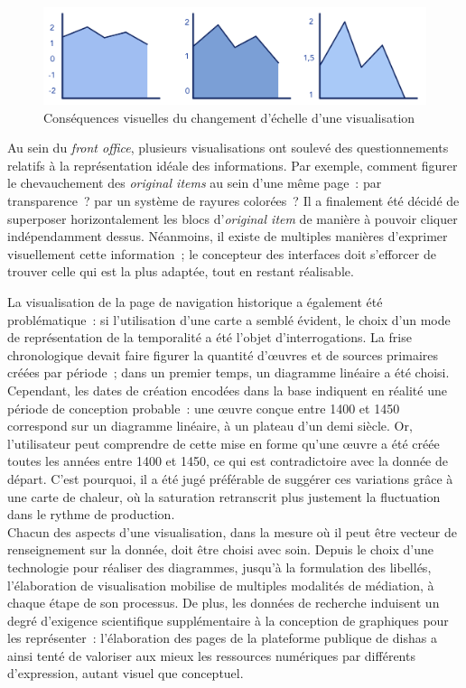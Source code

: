 \documentclass[a4paper,12pt,twoside]{book}
\newcommand{\eng}{\emph}
\newcommand{\oi}{\eng{original item}\xspace}
\newcommand{\ois}{\eng{original items}\xspace}
\newcommand{\fo}{\eng{front office}\xspace}
\newcommand{\dishas}{\gls{dishas}\xspace}
\begin{document}
\begin{figure}[h!]
	\centering
	\includegraphics[width=15cm]{Images/Echelle-visualisation.png}
	\caption{Conséquences visuelles du changement d'échelle d'une visualisation}
\end{figure}

Au sein du \fo, plusieurs visualisations ont soulevé des questionnements relatifs à la représentation idéale des informations. Par exemple, comment figurer le chevauchement des \ois au sein d'une même page~: par transparence~? par un système de rayures colorées~? Il a finalement été décidé de superposer horizontalement les blocs d'\oi de manière à pouvoir cliquer indépendamment dessus. Néanmoins, il existe de multiples manières d'exprimer visuellement cette information~; le concepteur des interfaces doit s'efforcer de trouver celle qui est la plus adaptée, tout en restant réalisable.

La visualisation de la page de navigation historique a également été problématique~: si l'utilisation d'une carte a semblé évident, le choix d'un mode de représentation de la temporalité a été l'objet d'interrogations. La frise chronologique devait faire figurer la quantité d'œuvres et de sources primaires créées par période~; dans un premier temps, un diagramme linéaire a été choisi. Cependant, les dates de création encodées dans la base indiquent en réalité une période de conception probable~: une œuvre conçue entre 1400 et 1450 correspond sur un diagramme linéaire, à un plateau d'un demi siècle. Or, l'utilisateur peut comprendre de cette mise en forme qu'une œuvre a été créée toutes les années entre 1400 et 1450, ce qui est contradictoire avec la donnée de départ. C'est pourquoi, il a été jugé préférable de suggérer ces variations grâce à une carte de chaleur, où la saturation retranscrit plus justement la fluctuation dans le rythme de production.\\

Chacun des aspects d'une visualisation, dans la mesure où il peut être vecteur de renseignement sur la donnée, doit être choisi avec soin. Depuis le choix d'une technologie pour réaliser des diagrammes, jusqu'à la formulation des libellés, l'élaboration de visualisation mobilise de multiples modalités de médiation, à chaque étape de son processus. De plus, les données de recherche induisent un degré d'exigence scientifique supplémentaire à la conception de graphiques pour les représenter~: l'élaboration des pages de la plateforme publique de \dishas a ainsi tenté de valoriser aux mieux les ressources numériques par différents d'expression, autant visuel que conceptuel.
\end{document}
